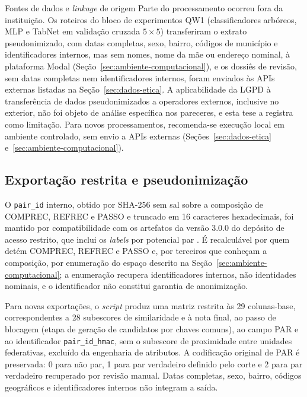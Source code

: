\begin{chapter}{Fontes de dados e \textit{linkage} de origem}
Parte do processamento ocorreu fora da instituição. Os roteiros do bloco de experimentos QW1 (classificadores arbóreos, MLP e TabNet em validação cruzada $5 \times 5$) transferiram o extrato pseudonimizado, com datas completas, sexo, bairro, códigos de município e identificadores internos, mas sem nomes, nome da mãe ou endereço nominal, à plataforma Modal (Seção~\ref{sec:ambiente-computacional}), e os dossiês de revisão, sem datas completas nem identificadores internos, foram enviados às APIs externas listadas na Seção~\ref{sec:dados-etica}. A aplicabilidade da LGPD à transferência de dados pseudonimizados a operadores externos, inclusive no exterior, não foi objeto de análise específica nos pareceres, e esta tese a registra como limitação. Para novos processamentos, recomenda-se execução local em ambiente controlado, sem envio a APIs externas (Seções~\ref{sec:dados-etica} e~\ref{sec:ambiente-computacional}).

\subsection{Exportação restrita e pseudonimização}\label{sec:export-restrita}

O \texttt{pair\_id} interno, obtido por SHA-256 sem sal sobre a composição de COMPREC, REFREC e PASSO e truncado em 16 caracteres hexadecimais, foi mantido por compatibilidade com os artefatos da versão 3.0.0 do depósito de acesso restrito, que inclui os \textit{labels} por potencial par \cite{Jardim2026zenodoGzcmd}. É recalculável por quem detém COMPREC, REFREC e PASSO e, por terceiros que conheçam a composição, por enumeração do espaço descrito na Seção~\ref{sec:ambiente-computacional}; a enumeração recupera identificadores internos, não identidades nominais, e o identificador não constitui garantia de anonimização.

{\sloppy
Para novas exportações, o \textit{script}  produz uma matriz restrita às 29 colunas-base, correspondentes a 28 subescores de similaridade e à nota final, ao passo de blocagem (etapa de geração de candidatos por chaves comuns), ao campo PAR e ao identificador \texttt{pair\_id\_hmac}, sem o subescore de proximidade entre unidades federativas, excluído da engenharia de atributos. A codificação original de PAR é preservada: 0 para não par, 1 para par verdadeiro definido pelo corte e 2 para par verdadeiro recuperado por revisão manual. Datas completas, sexo, bairro, códigos geográficos e identificadores internos não integram a saída.
\par}


\end{chapter}
